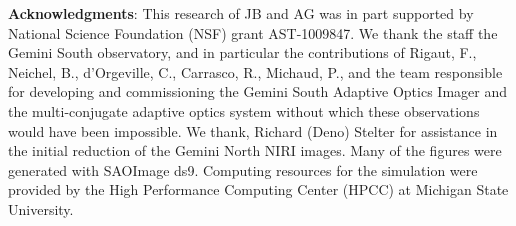\documentclass{aa}
\begin{document}
\begin{itemize}
\textbf{Acknowledgments}:
{This research of JB and AG was in part supported by  National Science 
Foundation (NSF) grant  AST-1009847.  We thank the staff the Gemini South observatory, and 
in particular the contributions of Rigaut, F., Neichel, B., d'Orgeville, C., Carrasco, R., 
Michaud, P., and the team responsible for developing and commissioning  the Gemini
South Adaptive Optics Imager and the multi-conjugate adaptive optics system without which
these observations would have been impossible.    We thank, Richard (Deno) Stelter for 
assistance  in the initial reduction of the Gemini North NIRI images.   Many of the figures
were generated with SAOImage ds9.  Computing resources for the simulation were 
provided by the High Performance Computing Center (HPCC) at Michigan State University.
}

\end{itemize}






\clearpage


\clearpage


\clearpage


\clearpage

\end{document}
